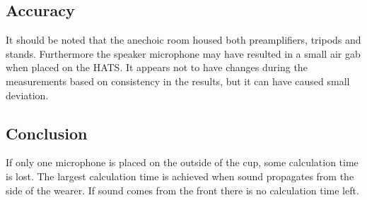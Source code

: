 \subsection{Accuracy}

It should be noted that the anechoic room housed both preamplifiers, tripods and stands. Furthermore the speaker microphone may have resulted in a small air gab when placed on the HATS. It appears not to have changes during the measurements based on consistency in the results, but it can have caused small deviation.

\subsection{Conclusion}
If only one microphone is placed on the outside of the cup, some calculation time is lost. The largest calculation time is achieved when sound propagates from the side of the wearer. If sound comes from the front there is no calculation time left. 